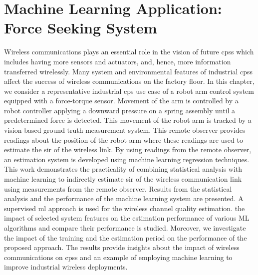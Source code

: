 
\chapter{Machine Learning Application: Force Seeking System}\label{chapter:ftml}

	
\chapterintro*

Wireless communications plays an essential role in the vision of future \glspl{cps} which includes having more sensors and actuators, and, hence, more information transferred wirelessly. Many system and environmental features of industrial \glspl{cps} affect the success of wireless communications on the factory floor. In this chapter, we consider a representative industrial \gls{cps} use case of a robot arm control system equipped with a force-torque sensor. Movement of the arm is controlled by a robot controller applying a downward pressure on a spring assembly until a predetermined force is detected. This movement of the robot arm is tracked by a vision-based ground truth measurement system. This remote observer provides readings about the position of the robot arm where these readings are used to estimate the \gls{sir} of the wireless link. By using readings from the remote observer, an estimation system is developed using machine learning regression techniques.  This work demonstrates the practicality of combining statistical analysis with machine learning to indirectly estimate \gls{sir} of the wireless communication link using measurements from the remote observer.  Results from the statistical analysis and the performance of the machine learning system are presented.  A supervised \gls{ml} approach is used for the wireless channel quality estimation. the impact of selected system features on the estimation performance of various ML algorithms and compare their performance is studied.  Moreover, we investigate the impact of the training and the estimation period on the performance of the proposed approach. The results provide insights about the impact of wireless communications on \glspl{cps} and an example of employing machine learning to improve industrial wireless deployments. 


	
